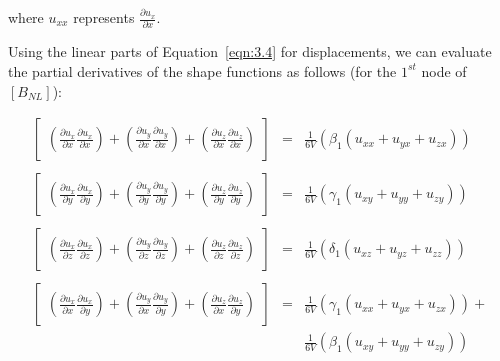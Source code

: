 \noindent where $u_{xx}$ represents $\frac{\partial{u_{x}}}{\partial{x}}$.

Using the linear parts of Equation~\ref{eqn:3.4} for displacements, we can evaluate the partial derivatives of the shape functions as follows (for the $1^{st}$ node of $[B_{NL}]$):

\begin{equation}
\begin{array}{lll}
\begin{bmatrix}
{\left(\frac{\partial{u_{x}}}{\partial{x}}\frac{\partial{u_{x}}}{\partial{x}}\right)}
+
{\left(\frac{\partial{u_{y}}}{\partial{x}}\frac{\partial{u_{y}}}{\partial{x}}\right)}
+
{\left(\frac{\partial{u_{z}}}{\partial{x}}\frac{\partial{u_{z}}}{\partial{x}}\right)}
\end{bmatrix}
& = &
\frac{1}{6V}(\beta_{1} (u_{xx} + u_{yx} + u_{zx})) \\ \; \\
\begin{bmatrix}
{\left(\frac{\partial{u_{x}}}{\partial{y}}\frac{\partial{u_{x}}}{\partial{y}}\right)}
+
{\left(\frac{\partial{u_{y}}}{\partial{y}}\frac{\partial{u_{y}}}{\partial{y}}\right)}
+
{\left(\frac{\partial{u_{z}}}{\partial{y}}\frac{\partial{u_{z}}}{\partial{y}}\right)}
\end{bmatrix}
& = &
\frac{1}{6V}(\gamma_{1} (u_{xy} + u_{yy} + u_{zy})) \\ \; \\
\begin{bmatrix}
{\left(\frac{\partial{u_{x}}}{\partial{z}}\frac{\partial{u_{x}}}{\partial{z}}\right)}
+
{\left(\frac{\partial{u_{y}}}{\partial{z}}\frac{\partial{u_{y}}}{\partial{z}}\right)}
+
{\left(\frac{\partial{u_{z}}}{\partial{z}}\frac{\partial{u_{z}}}{\partial{z}}\right)}
\end{bmatrix}
& = &
\frac{1}{6V}(\delta_{1} (u_{xz} + u_{yz} + u_{zz}))  \; \\ \\
\begin{bmatrix}
{\left(\frac{\partial{u_{x}}}{\partial{x}}\frac{\partial{u_{x}}}{\partial{y}}\right)}
+
{\left(\frac{\partial{u_{y}}}{\partial{x}}\frac{\partial{u_{y}}}{\partial{y}}\right)}
+
{\left(\frac{\partial{u_{z}}}{\partial{x}}\frac{\partial{u_{z}}}{\partial{y}}\right)}
\end{bmatrix}
& = &   \frac{1}{6V}(\gamma_{1} (u_{xx} + u_{yx} + u_{zx})) + \\
&   &   \frac{1}{6V}(\beta_{1} (u_{xy} + u_{yy} + u_{zy}))  \\ \; \\

\end{array}
\end{equation}
